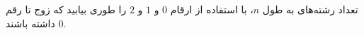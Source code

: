 \p
تعداد رشته‌های  
به طول 
$n$،
با استفاده از ارقام
$0$
و
$1$
و 
$2$
را طوری بیابید که زوج تا رقم 
$0$
داشته باشند.